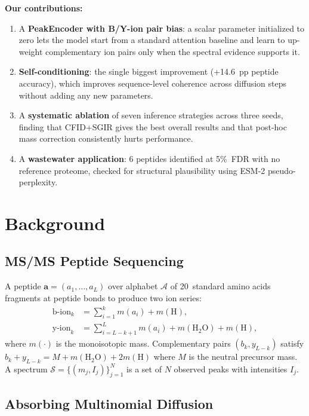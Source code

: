 \documentclass[10pt,twocolumn]{article}
\newcommand{\vect}[1]{\mathbf{#1}}
\begin{document}
\textbf{Our contributions:}
\begin{enumerate}[leftmargin=*, itemsep=2pt, topsep=2pt]
  \item A \textbf{PeakEncoder with B/Y-ion pair bias}:
        a scalar parameter initialized to zero lets the model start from a standard attention baseline
        and learn to up-weight complementary ion pairs only when the spectral evidence supports it.
  \item \textbf{Self-conditioning}: the single biggest improvement (+14.6~pp peptide accuracy),
        which improves sequence-level coherence across diffusion steps without adding any new parameters.
  \item A \textbf{systematic ablation} of seven inference strategies across three seeds,
        finding that CFID+SGIR gives the best overall results and that post-hoc mass correction
        consistently hurts performance.
  \item A \textbf{wastewater application}: 6 peptides identified at 5\%~FDR with no reference
        proteome, checked for structural plausibility using ESM-2 pseudo-perplexity.
\end{enumerate}

\section{Background}

\subsection{MS/MS Peptide Sequencing}

A peptide $\vect{a} = (a_1, \ldots, a_L)$ over alphabet $\mathcal{A}$ of 20~standard amino acids
fragments at peptide bonds to produce two ion series:
\begin{align}
  \text{b-ion}_k &= \sum_{i=1}^k m(a_i) + m(\text{H}),\label{eq:bion}\\
  \text{y-ion}_k &= \sum_{i=L-k+1}^L m(a_i) + m(\text{H}_2\text{O}) + m(\text{H}),\label{eq:yion}
\end{align}
where $m(\cdot)$ is the monoisotopic mass.
Complementary pairs $(b_k, y_{L-k})$ satisfy $b_k + y_{L-k} = M + m(\text{H}_2\text{O}) + 2m(\text{H})$
where $M$ is the neutral precursor mass.
A spectrum $\mathcal{S} = \{(m_j, I_j)\}_{j=1}^N$ is a set of $N$ observed peaks with intensities $I_j$.

\subsection{Absorbing Multinomial Diffusion}
\end{document}
